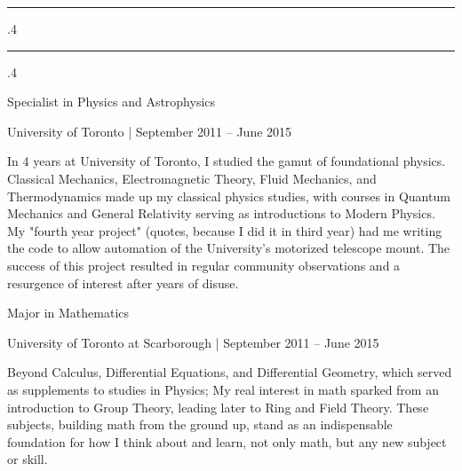 \documentclass[10pt]{article}
\makeatletter
\newcommand*\rulefill[1][.4\p@]{%
    \leavevmode
    \leaders \hrule \@height #1\relax \hfill
    \null
  }
\makeatother
\begin{document}
\begin{minipage}[t]{123mm}
\noindent
	\textcolor{black!20}{\rulefill\quad 
			{\fontsize{14}{25}\selectfont \textsl{}}
	\quad\rulefill}
\flushleft
\vspace{.35cm}

	{\fontsize{14}{20}\selectfont \textcolor{black!65}{
		Specialist in Physics and Astrophysics}}

\vspace{.1cm}

	{\fontsize{10}{12}\selectfont 
		\textcolor{black!65}{
			University of Toronto | September 2011 -- June 2015}}

\vspace{-0.75cm}

	{\fontsize{13}{16}\selectfont \textcolor{black!45}{
		\begin{justify}
			In 4 years at University of Toronto, I studied the gamut of foundational physics.
			Classical Mechanics, Electromagnetic Theory, Fluid Mechanics, and Thermodynamics
			made up my classical physics studies, with courses in Quantum Mechanics and 
			General Relativity serving as introductions to Modern Physics. My "fourth year project"
			(quotes, because I did it in third year) had me writing the code to allow automation
			of the University's motorized telescope mount. The success of this project resulted
			 in regular community observations and a resurgence of interest after years of disuse. 
		\end{justify}}}

\vspace{.35cm}

	{\fontsize{14}{20}\selectfont \textcolor{black!65}{Major in Mathematics}}

\vspace{.1cm}

	{\fontsize{10}{12}\selectfont 
		\textcolor{black!65}{University of Toronto at Scarborough | September 2011 --  June 2015}}

\vspace{-0.75cm}

	{\fontsize{13}{16}\selectfont \textcolor{black!45}{
		\begin{justify}
			Beyond Calculus, Differential Equations, and Differential Geometry, which served 
			as supplements to studies in Physics;
			My real interest in math sparked from an introduction to Group Theory, leading 
			later to Ring and Field Theory. These subjects, building math from the ground up, 
			stand as an indispensable foundation for how I think about and learn, not only math,
			but any new subject or skill.
		\end{justify}}}
\end{minipage}
\end{document}
